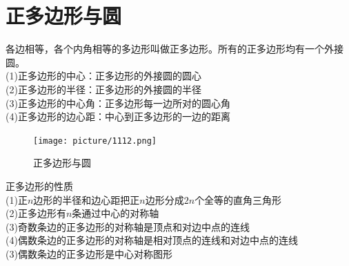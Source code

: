 \documentclass{ecnuthesis}
\begin{document}
\section{正多边形与圆}
\begin{knowledge}
    各边相等，各个内角相等的多边形叫做正多边形。所有的正多边形均有一个外接圆。\\
    (1)正多边形的中心：正多边形的外接圆的圆心 \\
    (2)正多边形的半径：正多边形的外接圆的半径 \\
    (3)正多边形的中心角：正多边形每一边所对的圆心角 \\
    (4)正多边形的边心距：中心到正多边形的一边的距离
\end{knowledge}
\begin{figure}[H]
\centering
\texttt{[image: picture/1112.png]}
\caption{正多边形与圆}
\end{figure}
\begin{knowledge}
    正多边形的性质 \\
    (1)正$n$边形的半径和边心距把正$n$边形分成$2n$个全等的直角三角形 \\
    (2)正多边形有$n$条通过中心的对称轴 \\
    (3)奇数条边的正多边形的对称轴是顶点和对边中点的连线 \\
    (4)偶数条边的正多边形的对称轴是相对顶点的连线和对边中点的连线 \\
    (3)偶数条边的正多边形是中心对称图形
\end{knowledge}
\clearpage
\end{document}
